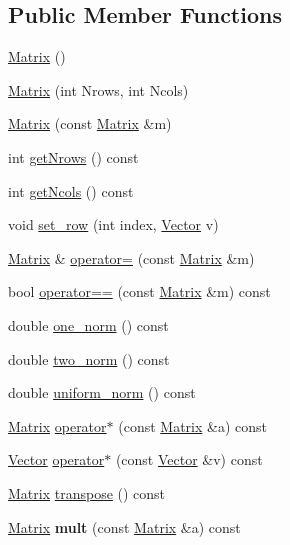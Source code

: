 \subsection*{Public Member Functions}
\begin{DoxyCompactItemize}
\item 
\hyperlink{classMatrix_a2dba13c45127354c9f75ef576f49269b}{Matrix} ()
\item 
\hyperlink{classMatrix_a135a15de1126d735bb95fcc839d739d7}{Matrix} (int Nrows, int Ncols)
\item 
\hyperlink{classMatrix_a765f4dcb51b6829311cc3e7576388423}{Matrix} (const \hyperlink{classMatrix}{Matrix} \&m)
\item 
int \hyperlink{classMatrix_ab0ed1933348c0511d74f825b73778aaa}{get\+Nrows} () const 
\item 
int \hyperlink{classMatrix_a09f35c4f255ad102a8692a4a2c6ccc0d}{get\+Ncols} () const 
\item 
void \hyperlink{classMatrix_a24066c6e9743a07387bcb287437a6cea}{set\+\_\+row} (int index, \hyperlink{classVector}{Vector} v)
\item 
\hyperlink{classMatrix}{Matrix} \& \hyperlink{classMatrix_aea5a06385f646eb4a63929fae6fa3e14}{operator=} (const \hyperlink{classMatrix}{Matrix} \&m)
\item 
bool \hyperlink{classMatrix_a5bc97450e589f9ae3a43814808645f3f}{operator==} (const \hyperlink{classMatrix}{Matrix} \&m) const 
\item 
double \hyperlink{classMatrix_a4f7ede695709b614f2e1f6423a024201}{one\+\_\+norm} () const 
\item 
double \hyperlink{classMatrix_a0b738b2c1d87ec28b23c7e479d014f2a}{two\+\_\+norm} () const 
\item 
double \hyperlink{classMatrix_a05777a670e901010b96e9d667a4bdd3b}{uniform\+\_\+norm} () const 
\item 
\hyperlink{classMatrix}{Matrix} \hyperlink{classMatrix_a1fbef471bec2714e891c082a345d2274}{operator$\ast$} (const \hyperlink{classMatrix}{Matrix} \&a) const 
\item 
\hyperlink{classVector}{Vector} \hyperlink{classMatrix_a31aaaadc4c2f30ce01cd70c2e0c72f6f}{operator$\ast$} (const \hyperlink{classVector}{Vector} \&v) const 
\item 
\hyperlink{classMatrix}{Matrix} \hyperlink{classMatrix_a9da9f5ee8215491cc54ecc59ddeb3f73}{transpose} () const 
\item 
\hyperlink{classMatrix}{Matrix} {\bfseries mult} (const \hyperlink{classMatrix}{Matrix} \&a) const \hypertarget{classMatrix_a28ac82d2f9ec7e4f8a366ec7bd6bd54e}{}\label{classMatrix_a28ac82d2f9ec7e4f8a366ec7bd6bd54e}

\end{DoxyCompactItemize}

